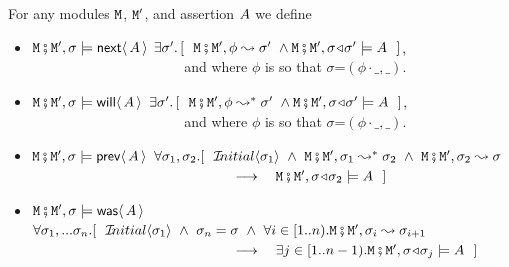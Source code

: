 \begin{definition}  \label{def:valid:assertion:time}
For any modules $\M$, $\M'$, and assertion  $\A$ we define
  
\begin{itemize}
 \item
  $\M\mkpair \M', \sigma \models  \Next \A $
  \IFF
  $\exists \sigma'.\, [\ \ \M\mkpair \M',\phi \leadsto  \sigma' \ \wedge \M\mkpair \M',\sigma\adapt\sigma' \models \A \ \  ]$,
 \\
$\strut ~ \hspace{1.4in} $ \hfill  and where $\phi$ is
so that $\sigma$=$(\phi\cdot\_,\_)$.\item
  $\M\mkpair \M', \sigma \models  \Future \A $
  \IFF
  $\exists \sigma'.\, [\ \ \M\mkpair \M',\phi \leadsto^* \sigma' \ \wedge \M\mkpair \M',\sigma\adapt\sigma' \models \A \ \  ]$,
 \\
$\strut ~ \hspace{1.4in} $   \hfill   and where $\phi$ is
so that $\sigma$=$(\phi\cdot\_,\_)$.  
  \item
 $\M\mkpair \M', \sigma \models  \Prev \A $ \IFF
 $\forall \sigma_1, \sigma_2. [\ \ \Initial{\sigma_1}\ \wedge \   \M\mkpair \M', \sigma_1  \leadsto^*  \sigma_2 \ \wedge \   \M\mkpair \M', \sigma_2  \leadsto   \sigma  
$
 \\
$\strut ~ \hspace{1.9in} $  \hfill    $ \longrightarrow \ \ \   
 \M\mkpair \M', \sigma\adapt\sigma_2  \models \A\ \
 ]$ 
 \item
 $\M\mkpair \M', \sigma \models  \Past \A $ \IFF
 $\forall \sigma_1, ... \sigma_n. [\ \ \Initial{\sigma_1}\ \wedge \  \sigma_n=\sigma 
  \ \wedge \ \forall i\in[1..n). \M\mkpair \M', \sigma_{i} \leadsto  \sigma_{i+1}
$
 \\
$\strut ~ \hspace{1.9in} $   \hfill   $ \longrightarrow \ \ \  \exists j\in [1..n-1).
 \M\mkpair \M', \sigma\adapt\sigma_j  \models \A\ \
 ]$ 
\end{itemize}
\end{definition}

%
 

